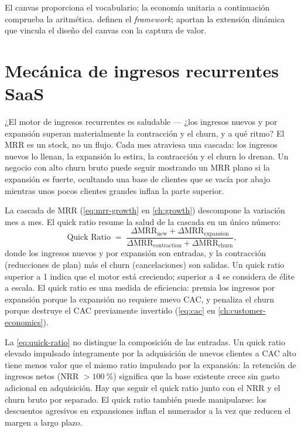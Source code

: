 El canvas proporciona el vocabulario; la economía unitaria a continuación comprueba la aritmética. \textcite{osterwalder2010} definen el \emph{framework}; \textcite{zott2011business} aportan la extensión dinámica que vincula el diseño del canvas con la captura de valor.

\section{Mecánica de ingresos recurrentes SaaS}\label{sec:saas-mrr}

¿El motor de ingresos recurrentes es saludable --- ¿los ingresos nuevos y por expansión superan materialmente la contracción y el churn, y a qué ritmo? El MRR es un stock, no un flujo. Cada mes atraviesa una cascada: los ingresos nuevos lo llenan, la expansión lo estira, la contracción y el churn lo drenan. Un negocio con alto churn bruto puede seguir mostrando un MRR plano si la expansión es fuerte, ocultando una base de clientes que se vacía por abajo mientras unos pocos clientes grandes inflan la parte superior.

La cascada de MRR (\cref{eq:mrr-growth} en \cref{ch:growth}) descompone la variación mes a mes. El quick ratio resume la salud de la cascada en un único número:
\begin{equation}\label{eq:quick-ratio}
  \text{Quick Ratio} \;=\; \frac{\Delta\text{MRR}_{\text{new}} + \Delta\text{MRR}_{\text{expansion}}}{\Delta\text{MRR}_{\text{contraction}} + \Delta\text{MRR}_{\text{churn}}},
\end{equation}
donde los ingresos nuevos y por expansión son entradas, y la contracción (reducciones de plan) más el churn (cancelaciones) son salidas. Un quick ratio superior a 1 indica que el motor está creciendo; superior a 4 se considera de élite a escala. El quick ratio es una medida de eficiencia: premia los ingresos por expansión porque la expansión no requiere nuevo CAC, y penaliza el churn porque destruye el CAC previamente invertido (\cref{eq:cac} en \cref{ch:customer-economics}).

La \cref{eq:quick-ratio} no distingue la composición de las entradas. Un quick ratio elevado impulsado íntegramente por la adquisición de nuevos clientes a CAC alto tiene menos valor que el mismo ratio impulsado por la expansión: la retención de ingresos netos (NRR $> \qty{100}{\percent}$) significa que la base existente crece sin gasto adicional en adquisición. Hay que seguir el quick ratio junto con el NRR y el churn bruto por separado. El quick ratio también puede manipularse: los descuentos agresivos en expansiones inflan el numerador a la vez que reducen el margen a largo plazo.

